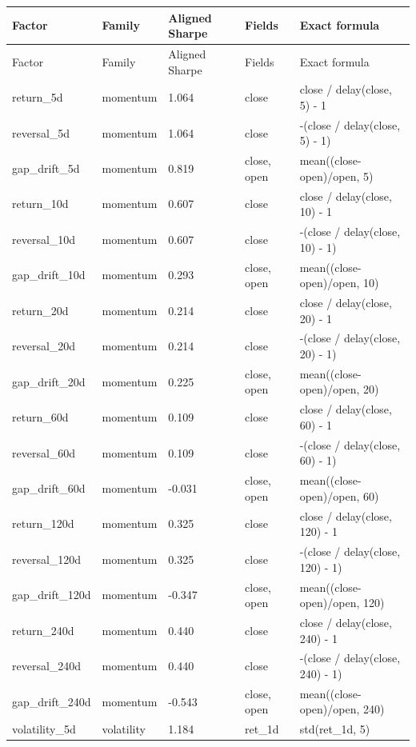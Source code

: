 \scriptsize
\setlength{\tabcolsep}{2pt}
\begin{longtable}{p{}p{}p{}p{}p{}}
\toprule
Factor & Family & Aligned Sharpe & Fields & Exact formula \\
\midrule
\endfirsthead
\toprule
Factor & Family & Aligned Sharpe & Fields & Exact formula \\
\midrule
\endhead
return\_5d & momentum & 1.064 & close & close / delay(close, 5) - 1 \\
reversal\_5d & momentum & 1.064 & close & -(close / delay(close, 5) - 1) \\
gap\_drift\_5d & momentum & 0.819 & close, open & mean((close-open)/open, 5) \\
return\_10d & momentum & 0.607 & close & close / delay(close, 10) - 1 \\
reversal\_10d & momentum & 0.607 & close & -(close / delay(close, 10) - 1) \\
gap\_drift\_10d & momentum & 0.293 & close, open & mean((close-open)/open, 10) \\
return\_20d & momentum & 0.214 & close & close / delay(close, 20) - 1 \\
reversal\_20d & momentum & 0.214 & close & -(close / delay(close, 20) - 1) \\
gap\_drift\_20d & momentum & 0.225 & close, open & mean((close-open)/open, 20) \\
return\_60d & momentum & 0.109 & close & close / delay(close, 60) - 1 \\
reversal\_60d & momentum & 0.109 & close & -(close / delay(close, 60) - 1) \\
gap\_drift\_60d & momentum & -0.031 & close, open & mean((close-open)/open, 60) \\
return\_120d & momentum & 0.325 & close & close / delay(close, 120) - 1 \\
reversal\_120d & momentum & 0.325 & close & -(close / delay(close, 120) - 1) \\
gap\_drift\_120d & momentum & -0.347 & close, open & mean((close-open)/open, 120) \\
return\_240d & momentum & 0.440 & close & close / delay(close, 240) - 1 \\
reversal\_240d & momentum & 0.440 & close & -(close / delay(close, 240) - 1) \\
gap\_drift\_240d & momentum & -0.543 & close, open & mean((close-open)/open, 240) \\
volatility\_5d & volatility & 1.184 & ret\_1d & std(ret\_1d, 5) \\

\end{longtable}
